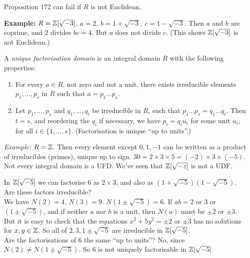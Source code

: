 \documentclass[10pt]{scrartcl}
\begin{document}
 Proposition 172 can fail if $R$ is not Euclidean.
 
 \textbf{Example:} $R = \mathbb{Z}[\sqrt{-3}]$. $a = 2, ~b = 1 + \sqrt{-3},~ c = 1-\sqrt{-3}$. Then $a$ and $b$ are coprime, and $2$ divides $bc = 4$. But $a$ does not divide $c$. (This shows $\mathbb{Z}[\sqrt{-3}]$ is not Euclidean.)\\
 
 \begin{definition} A \emph{unique factorisation domain} is an integral domain $R$ with the following properties:\begin{enumerate}
\item For every $a \in R$, not zero and not a unit, there exists irreducible elements $p_1,\dots,p_s$ in $R$ such that $a = p_1\dots p_s$.
\item Let $p_1,\dots,p_s$ and $q_1,\dots,q_t$ be irreducible in $R$, such that $p_1\dots p_s = q_1\dots q_t$. Then $t = s$, and reordering the $q_i$ if necessary, we have $p_i = q_iu_i$ for some unit $u_i$, for all $i \in \{1,\dots,s\}$. (Factorisation is unique ``up to units''.)
\end{enumerate} \end{definition}

\textit{Example:} $R = \mathbb{Z}$. Then every element except $0,1,-1$ can be written as a product of irreducibles (primes), unique up to sign. $30 = 2\times 3 \times 5 = (-2) \times 3 \times (-5)$.\\

  
 Not   
 every integral domain is a UFD. We've seen that $\mathbb{Z}[\sqrt{-z}]$ is not a UDF.\\
  
\begin{example} In $\mathbb{Z}[\sqrt{-5}]$ we can factorise $6$ as $2\times 3$, and also as $(1 + \sqrt{-5})(1-\sqrt{-5})$. Are these factors irreducible?\vspace*{5pt}\\ We have $N(2) = 4$, $N(3) = 9$. $N(1 \pm \sqrt{-5}) = 6$. If $ab = 2$ or $3$ or $(1 \pm \sqrt{-5})$, and if neither $a$ nor $b$ is a unit, then $N(a)$ must be $\pm 2$ or $\pm 3$. But it is easy to check that the equations $x^2 + 5y^2 = \pm 2$ or $\pm 3$ has no solutions for $x,y \in \mathbb{Z}$. So all of $2,3,1\pm \sqrt{-5}$ are irreducible in $\mathbb{Z}[\sqrt{-5}]$. \vspace*{5pt}\\ Are the factorisations of $6$ the same ``up to units''? No, since $N(2) \neq N(1 \pm \sqrt{-5})$. So $6$ is not uniquely factorisable in $\mathbb{Z}[\sqrt{-5}]$
	
\end{example}
\end{document}
